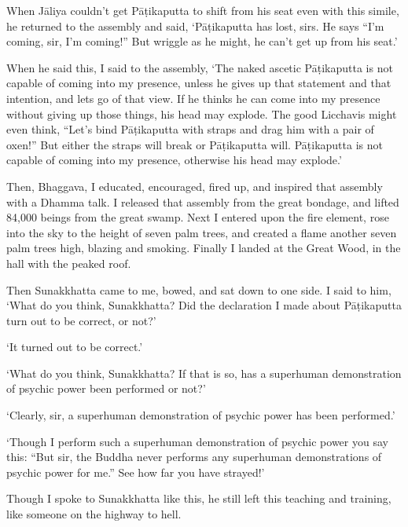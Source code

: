 \documentclass[12pt,openany]{book}%
\begin{document}
When \textsanskrit{Jāliya} couldn’t get \textsanskrit{Pāṭikaputta} to shift from his seat even with this simile, he returned to the assembly and said, ‘\textsanskrit{Pāṭikaputta} has lost, sirs. He says “I’m coming, sir, I’m coming!” But wriggle as he might, he can’t get up from his seat.’ 

When he said this, I said to the assembly, ‘The naked ascetic \textsanskrit{Pāṭikaputta} is not capable of coming into my presence, unless he gives up that statement and that intention, and lets go of that view. If he thinks he can come into my presence without giving up those things, his head may explode. The good Licchavis might even think, “Let’s bind \textsanskrit{Pāṭikaputta} with straps and drag him with a pair of oxen!” But either the straps will break or \textsanskrit{Pāṭikaputta} will. \textsanskrit{Pāṭikaputta} is not capable of coming into my presence, otherwise his head may explode.’ 

Then, Bhaggava, I educated, encouraged, fired up, and inspired that assembly with a Dhamma talk. I released that assembly from the great bondage, and lifted 84,000 beings from the great swamp. Next I entered upon the fire element, rose into the sky to the height of seven palm trees, and created a flame another seven palm trees high, blazing and smoking. Finally I landed at the Great Wood, in the hall with the peaked roof. 

Then Sunakkhatta came to me, bowed, and sat down to one side. I said to him, ‘What do you think, Sunakkhatta? Did the declaration I made about \textsanskrit{Pāṭikaputta} turn out to be correct, or not?’ 

‘It turned out to be correct.’ 

‘What do you think, Sunakkhatta? If that is so, has a superhuman demonstration of psychic power been performed or not?’ 

‘Clearly, sir, a superhuman demonstration of psychic power has been performed.’ 

‘Though I perform such a superhuman demonstration of psychic power you say this: “But sir, the Buddha never performs any superhuman demonstrations of psychic power for me.” See how far you have strayed!’ 

Though I spoke to Sunakkhatta like this, he still left this teaching and training, like someone on the highway to hell. 
\end{document}
